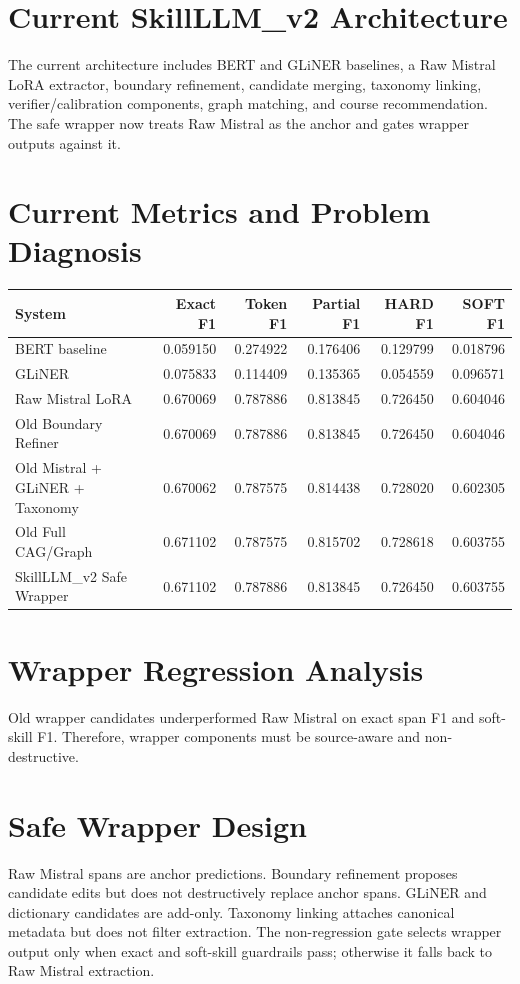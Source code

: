 \documentclass[11pt]{article}
\begin{document}
\section{Current SkillLLM\_v2 Architecture}
The current architecture includes BERT and GLiNER baselines, a Raw Mistral LoRA extractor, boundary refinement, candidate merging, taxonomy linking, verifier/calibration components, graph matching, and course recommendation. The safe wrapper now treats Raw Mistral as the anchor and gates wrapper outputs against it.

\section{Current Metrics and Problem Diagnosis}
\begin{longtable}{lrrrrr}
\toprule
System & Exact F1 & Token F1 & Partial F1 & HARD F1 & SOFT F1 \\
\hline
BERT baseline & 0.059150 & 0.274922 & 0.176406 & 0.129799 & 0.018796 \\
GLiNER & 0.075833 & 0.114409 & 0.135365 & 0.054559 & 0.096571 \\
Raw Mistral LoRA & 0.670069 & 0.787886 & 0.813845 & 0.726450 & 0.604046 \\
Old Boundary Refiner & 0.670069 & 0.787886 & 0.813845 & 0.726450 & 0.604046 \\
Old Mistral + GLiNER + Taxonomy & 0.670062 & 0.787575 & 0.814438 & 0.728020 & 0.602305 \\
Old Full CAG/Graph & 0.671102 & 0.787575 & 0.815702 & 0.728618 & 0.603755 \\
SkillLLM\_v2 Safe Wrapper & 0.671102 & 0.787886 & 0.813845 & 0.726450 & 0.603755 \\
\bottomrule
\end{longtable}

\section{Wrapper Regression Analysis}
Old wrapper candidates underperformed Raw Mistral on exact span F1 and soft-skill F1. Therefore, wrapper components must be source-aware and non-destructive.

\section{Safe Wrapper Design}
Raw Mistral spans are anchor predictions. Boundary refinement proposes candidate edits but does not destructively replace anchor spans. GLiNER and dictionary candidates are add-only. Taxonomy linking attaches canonical metadata but does not filter extraction. The non-regression gate selects wrapper output only when exact and soft-skill guardrails pass; otherwise it falls back to Raw Mistral extraction.
\end{document}

